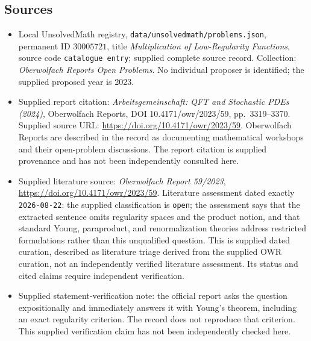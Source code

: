 \documentclass[11pt]{article}
\begin{document}
\subsection{Sources}
\begin{itemize}
\item Local UnsolvedMath registry, \texttt{data/unsolvedmath/problems.json}, permanent ID \(30005721\), title \emph{Multiplication of Low-Regularity Functions}, source code \texttt{catalogue entry}; supplied complete source record. Collection: \emph{Oberwolfach Reports Open Problems}. No individual proposer is identified; the supplied proposed year is 2023.
\item Supplied report citation: \emph{Arbeitsgemeinschaft: QFT and Stochastic PDEs (2024)}, Oberwolfach Reports, DOI 10.4171/owr/2023/59, pp.\ 3319--3370. Supplied source URL: \url{https://doi.org/10.4171/owr/2023/59}. Oberwolfach Reports are described in the record as documenting mathematical workshops and their open-problem discussions. The report citation is supplied provenance and has not been independently consulted here.
\item Supplied literature source: \emph{Oberwolfach Report 59/2023}, \url{https://doi.org/10.4171/owr/2023/59}. Literature assessment dated exactly \texttt{2026-08-22}: the supplied classification is \texttt{open}; the assessment says that the extracted sentence omits regularity spaces and the product notion, and that standard Young, paraproduct, and renormalization theories address restricted formulations rather than this unqualified question. This is supplied dated curation, described as literature triage derived from the supplied OWR curation, not an independently verified literature assessment. Its status and cited claims require independent verification.
\item Supplied statement-verification note: the official report asks the question expositionally and immediately answers it with Young's theorem, including an exact regularity criterion. The record does not reproduce that criterion. This supplied verification claim has not been independently checked here.
\end{itemize}
\end{document}
